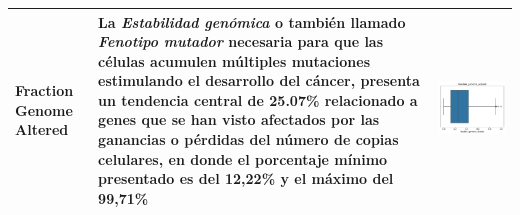 \begin{table}[!htb]
\begin{threeparttable}
\begin{tabular}{p{2.5cm} p{7cm} p{6.5cm}}
			Fraction Genome Altered
			& La \textit{Estabilidad genómica} o también llamado \textit{Fenotipo mutador} necesaria para que las células acumulen múltiples mutaciones estimulando el desarrollo del cáncer, presenta un tendencia central de 25.07\% relacionado a genes que se han visto afectados por las ganancias o pérdidas del número de copias celulares, en donde el porcentaje mínimo presentado es del 12,22\% y el máximo del 99,71\%
			
			& \begin{center}\includegraphics[width=1\linewidth]{NOTEBOOK/IMAGENES_DESCRIPTIVAS/17_fraction_genome_altered}\end{center}
			\\ \hline
			

\end{tabular}
\end{threeparttable}
\end{table}
